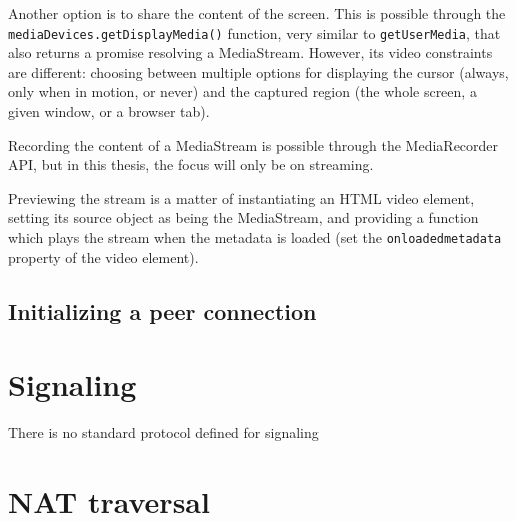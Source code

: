 \indent \par Another option is to share the content of the screen. This is possible through the \texttt{mediaDevices.getDisplayMedia()} function, very similar to \texttt{getUserMedia}, that also returns a promise resolving a MediaStream. However, its video constraints are different: choosing between multiple options for displaying the cursor (always, only when in motion, or never) and the captured region (the whole screen, a given window, or a browser tab).
\indent \par Recording the content of a MediaStream is possible through the MediaRecorder API, but in this thesis, the focus will only be on streaming.
\indent \par Previewing the stream is a matter of instantiating an HTML video element, setting its source object as being the MediaStream, and providing a function which plays the stream when the metadata is loaded (set the \texttt{onloadedmetadata} property of the video element).

\subsection{Initializing a peer connection}
\label{sec:ch2sec1subsec2}

\section{Signaling}
\indent \par There is no standard protocol defined for signaling

\section{NAT traversal}